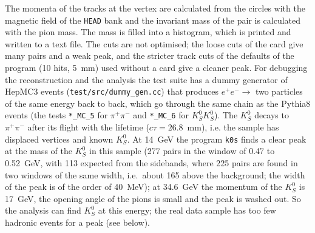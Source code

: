 The momenta of the tracks at the vertex are calculated from the circles with the magnetic field of the \texttt{HEAD} bank and the invariant mass of the pair is calculated with the pion mass.
The mass is filled into a histogram, which is printed and written to a text file. The cuts are not optimised; the loose cuts of the card give many pairs and a weak peak, and the stricter track cuts of the defaults of the program (10 hits, 5~mm) used without a card give a cleaner peak.
For debugging the reconstruction and the analysis the test suite has a dummy generator of HepMC3 events (\texttt{test/src/dummy\_gen.cc}) that produces $e^+e^-\to$ two particles of the same energy back to back, which go through the same chain as the Pythia8 events
(the tests \texttt{*\_MC\_5} for $\pi^+\pi^-$ and \texttt{*\_MC\_6} for $K^0_SK^0_S$). The $K^0_S$ decays to $\pi^+\pi^-$ after its flight with the lifetime ($c\tau=26.8$~mm), i.e. the sample has displaced vertices and known $K^0_S$.
At 14~GeV the program \texttt{k0s} finds a clear peak at the mass of the $K^0_S$ in this sample (277 pairs in the window of 0.47 to 0.52~GeV, with 113 expected from the sidebands, where 225 pairs are found in two windows of the same width, i.e.\ about 165 above the background; the width of the peak is of the order of 40~MeV); at 34.6~GeV the momentum of the $K^0_S$ is 17~GeV, the opening angle of the pions is small and the peak is washed out.
So the analysis can find $K^0_S$ at this energy; the real data sample has too few hadronic events for a peak (see below).
